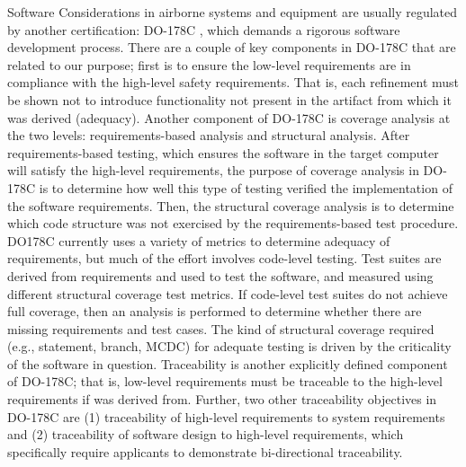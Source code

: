 Software Considerations in airborne systems and equipment are usually regulated by another certification: DO-178C \cite{DO178C}, which demands a rigorous software development process.   There are a couple of key components in DO-178C that are related to our purpose; first is to ensure the low-level requirements are in compliance with the high-level safety requirements. That is, each refinement must be shown not to introduce functionality not present in the artifact from which it was derived (adequacy). 
Another component of DO-178C is coverage analysis at the two levels: requirements-based analysis and structural analysis.
After requirements-based testing, which ensures the software in the target computer will satisfy the high-level requirements, the purpose of coverage analysis in DO-178C is to determine how well this type of testing verified the implementation of the software requirements. Then, the structural coverage analysis is to determine which code structure was not exercised by the requirements-based test procedure. 
DO178C currently uses a variety of metrics to determine adequacy of requirements, but much of the effort involves code-level testing.  Test suites are derived from requirements and used to test the software, and measured using different structural coverage test metrics.
If code-level test suites do not achieve full coverage, then an analysis is performed to determine whether there are missing requirements and test cases.  The kind of structural coverage required (e.g., statement, branch, MCDC) for adequate testing is driven by the criticality of the software in question.
Traceability is another explicitly defined component of DO-178C; that is, low-level requirements must be traceable to the high-level requirements if was derived from. Further, two other traceability objectives in DO-178C are (1) traceability of high-level requirements to system requirements and (2) traceability of software design to high-level requirements, which specifically require applicants to demonstrate bi-directional traceability.

